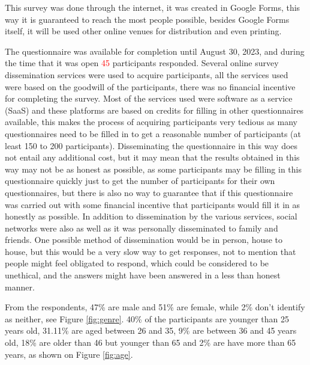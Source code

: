 This survey was done through the internet, it was created in Google Forms,
this way it is guaranteed to reach the most people possible, besides Google
Forms itself, it will be used other online venues for distribution and even
printing.

The questionnaire was available for completion until August 30, 2023,
and during the time that it was open \textcolor{red}{45} participants responded.
Several online survey dissemination services were used to acquire participants,
all the services used were based on the goodwill of the participants, there
was no financial incentive for completing the survey. Most of the services
used were software as a service (SaaS) and  these platforms are based
on credits for filling in other questionnaires available, this makes the process
of acquiring participants very tedious as many questionnaires need to be
filled in to get a reasonable number of participants (at least 150 to
200 participants). Disseminating the questionnaire in this way does not
entail any additional cost, but it may mean that the results obtained
in this way may not be as honest as possible, as some participants may
be filling in this questionnaire quickly just to get the number of participants
for their own questionnaires, but there is also no way to guarantee that
if this questionnaire was carried out with some financial incentive that
participants would fill it in as honestly as possible. In addition to
dissemination by the various services, social networks were also as well
as it was personally disseminated to family and friends. One possible
method of dissemination would be in person, house to house,
but this would be a very slow way to get responses, not to mention that
people might feel obligated to respond, which could be considered to be
unethical, and the answers might have been answered in a less than
honest manner.

From the respondents, 47\% are male and 51\% are female, while 2\% don't identify
as neither, see Figure \ref*{fig:genre}. 40\% of the participants are younger
than 25 years old, 31.11\% are aged between 26 and 35, 9\% are between
36 and 45 years old, 18\% are older than 46 but younger than 65 and 2\% are
have more than 65 years, as shown on Figure \ref*{fig:age}.

